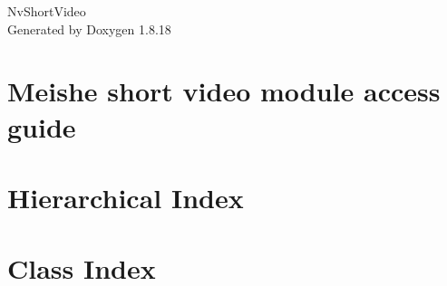 \let\mypdfximage\pdfximage\def\pdfximage{\immediate\mypdfximage}\documentclass[twoside]{book}
\newcommand{\+}{\discretionary{\mbox{\scriptsize$\hookleftarrow$}}{}{}}
\newcommand{\clearemptydoublepage}{%
  \newpage{\pagestyle{empty}\cleardoublepage}%
}
\begin{document}
\hypersetup{pageanchor=false,
             bookmarksnumbered=true,
             pdfencoding=unicode
            }
\begin{titlepage}
\vspace*{7cm}
\begin{center}%
{\Large Nv\+Short\+Video }\\
\vspace*{1cm}
{\large Generated by Doxygen 1.8.18}\\
\end{center}
\end{titlepage}
\clearemptydoublepage
{}
\tableofcontents
\clearemptydoublepage
{}
\hypersetup{pageanchor=true}

\chapter{Meishe short video module access guide}
\label{index}\hypertarget{index}{}
\chapter{Hierarchical Index}

\chapter{Class Index}

\end{document}
